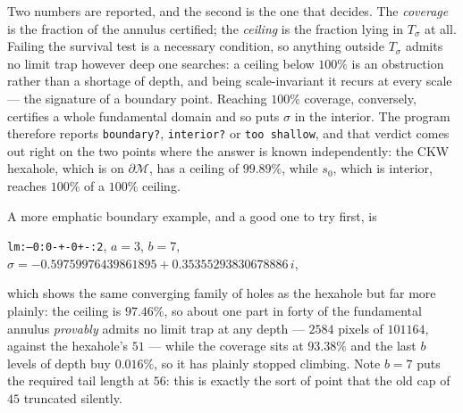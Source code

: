 \documentclass{amsart}
\begin{document}
\begin{description}
Two numbers are reported, and the second is the one that decides.  The \emph{coverage} is
the fraction of the annulus certified; the \emph{ceiling} is the fraction lying in
$T_\sigma$ at all.  Failing the survival test is a necessary condition, so anything outside
$T_\sigma$ admits no limit trap however deep one searches: a ceiling below $100\%$ is an
obstruction rather than a shortage of depth, and being scale-invariant it recurs at every
scale --- the signature of a boundary point.  Reaching $100\%$ coverage, conversely,
certifies a whole fundamental domain and so puts $\sigma$ in the interior.  The program
therefore reports \texttt{boundary?}, \texttt{interior?} or \texttt{too shallow}, and that
verdict comes out right on the two points where the answer is known independently: the CKW
hexahole, which is on $\partial\mathcal{M}$, has a ceiling of $99.89\%$, while $s_0$, which
is interior, reaches $100\%$ of a $100\%$ ceiling.

A more emphatic boundary example, and a good one to try first, is
\begin{center}
\texttt{lm:--0:0-+-0+-:2}, \quad $a = 3$, \quad $b = 7$,\\[2pt]
$\sigma = -0.59759976439861895 + 0.35355293830678886\,i$,
\end{center}
which shows the same converging family of holes as the hexahole but far more plainly: the ceiling
is $97.46\%$, so about one part in forty of the fundamental annulus \emph{provably} admits no
limit trap at any depth --- $2584$ pixels of $101164$, against the hexahole's $51$ --- while the
coverage sits at $93.38\%$ and the last $b$ levels of depth buy $0.016\%$, so it has plainly
stopped climbing.  Note $b = 7$ puts the required tail length at $56$: this is exactly the sort of
point that the old cap of $45$ truncated silently.


\end{description}
\end{document}
